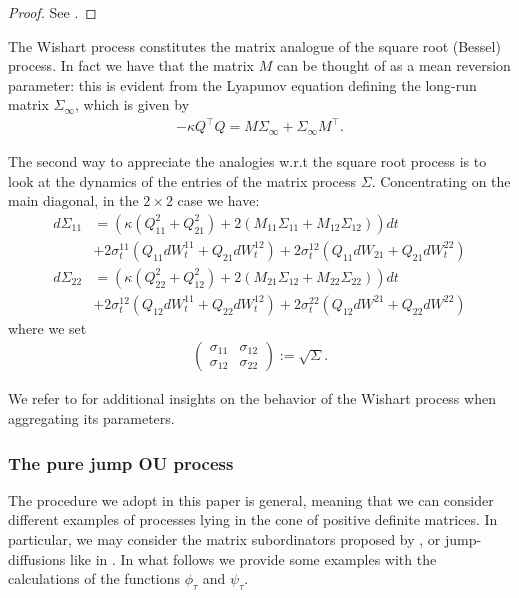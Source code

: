 \begin{proof}
See  \cite{article_Grasselli}.
\end{proof}
The Wishart process constitutes the matrix analogue of the square root (Bessel) process. In fact we have that the matrix $M$ can be thought of as a mean reversion parameter: this is evident from the Lyapunov equation defining the long-run matrix $\Sigma_\infty$, which is given by
\begin{align}
-\kappa Q^{\top}Q=M\Sigma_\infty+\Sigma_\infty M^{\top}.\label{Lyap}
\end{align}

The second way to appreciate the analogies w.r.t the square root process is to look at the dynamics of the entries of the matrix process $\Sigma$. Concentrating on the main diagonal, in the $2\times 2$ case we have:
\begin{align}
d\Sigma_{11}&=\left(\kappa\left(Q_{11}^2+Q_{21}^2\right)+2\left(M_{11}\Sigma_{11}+M_{12}\Sigma_{12}\right)\right)dt\nonumber\\
&+2\sigma_t^{11}\left(Q_{11}dW_t^{11}+Q_{21}dW_t^{12}\right)+2\sigma_t^{12}\left(Q_{11}dW_{21}+Q_{21}dW_t^{22}\right)\\
d\Sigma_{22}&=\left(\kappa\left(Q_{22}^2+Q_{12}^2\right)+2\left(M_{21}\Sigma_{12}+M_{22}\Sigma_{22}\right)\right)dt\nonumber\\
&+2\sigma_t^{12}\left(Q_{12}dW_t^{11}+Q_{22}dW_t^{12}\right)+2\sigma_t^{22}\left(Q_{12}dW^{21}+Q_{22}dW^{22}\right)
\end{align}
where we set
\begin{align}
\left(\begin{array}{rr}
\sigma_{11}&\sigma_{12}\\
\sigma_{12}&\sigma_{22}
\end{array}\right):=\sqrt{\Sigma}.
\end{align}

We refer to \cite{article_DaFonseca4} for additional insights on the behavior of the Wishart process when aggregating its parameters.




\subsubsection{The pure jump OU process}\label{pure_jump}
The procedure we adopt in this paper is general, meaning that we can consider different examples of processes lying in the cone of positive definite matrices. In particular, we may consider the matrix subordinators proposed by \cite{article_BNS02}, or jump-diffusions like in \cite{article_LT}. In what follows we provide some examples with the calculations of the functions $\phi_{\tau}$ and $\psi_{\tau}$.\\

